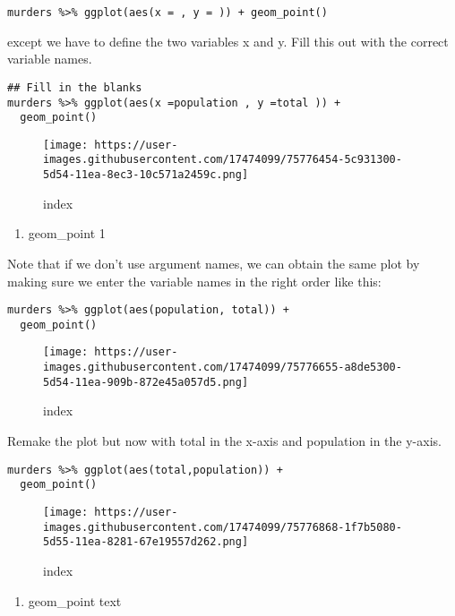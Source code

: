 \documentclass[]{article}
\providecommand{\tightlist}{%
  \setlength{\itemsep}{0pt}\setlength{\parskip}{0pt}}
\begin{document}
\begin{verbatim}
murders %>% ggplot(aes(x = , y = )) + geom_point()
\end{verbatim}

except we have to define the two variables x and y. Fill this out with
the correct variable names.

\begin{verbatim}
## Fill in the blanks
murders %>% ggplot(aes(x =population , y =total )) +
  geom_point()
\end{verbatim}

\begin{figure}
\centering
\texttt{[image: https://user-images.githubusercontent.com/17474099/75776454-5c931300-5d54-11ea-8ec3-10c571a2459c.png]}
\caption{index}
\end{figure}

\begin{enumerate}
\def\labelenumi{\arabic{enumi}.}
\setcounter{enumi}{5}
\tightlist
\item
  geom\_point 1
\end{enumerate}

Note that if we don't use argument names, we can obtain the same plot by
making sure we enter the variable names in the right order like this:

\begin{verbatim}
murders %>% ggplot(aes(population, total)) +
  geom_point()
\end{verbatim}

\begin{figure}
\centering
\texttt{[image: https://user-images.githubusercontent.com/17474099/75776655-a8de5300-5d54-11ea-909b-872e45a057d5.png]}
\caption{index}
\end{figure}

Remake the plot but now with total in the x-axis and population in the
y-axis.

\begin{verbatim}
murders %>% ggplot(aes(total,population)) +
  geom_point()
\end{verbatim}

\begin{figure}
\centering
\texttt{[image: https://user-images.githubusercontent.com/17474099/75776868-1f7b5080-5d55-11ea-8281-67e19557d262.png]}
\caption{index}
\end{figure}

\begin{enumerate}
\def\labelenumi{\arabic{enumi}.}
\setcounter{enumi}{6}
\tightlist
\item
  geom\_point text
\end{enumerate}
\end{document}
